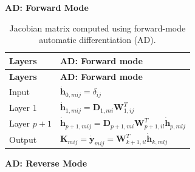 \documentclass[
  letterpaper,
  open=any]{scrbook}
\begin{document}
\textbf{AD: Forward Mode}

\begin{longtable}[]{@{}
  >{\raggedright\arraybackslash}p{}
  >{\raggedright\arraybackslash}p{}@{}}
\caption{Jacobian matrix computed using forward-mode automatic
differentiation (AD).}\label{tbl-ad-forward}\tabularnewline
\toprule\noalign{}
\begin{minipage}[b]{\linewidth}\raggedright
\textbf{Layers}
\end{minipage} & \begin{minipage}[b]{\linewidth}\raggedright
\textbf{AD: Forward mode}
\end{minipage} \\
\midrule\noalign{}
\endfirsthead
\toprule\noalign{}
\begin{minipage}[b]{\linewidth}\raggedright
\textbf{Layers}
\end{minipage} & \begin{minipage}[b]{\linewidth}\raggedright
\textbf{AD: Forward mode}
\end{minipage} \\
\midrule\noalign{}
\endhead
\bottomrule\noalign{}
\endlastfoot
Input & \(\dot{\mathbf{h}}_{0,mij}=\delta_{ij}\) \\
Layer 1 &
\(\dot{\mathbf{h}}_{1,mij}=\mathbf{D}_{1,mi}\mathbf{W}_{1,ij}^T\) \\
Layer \(p+1\) &
\(\dot{\mathbf{h}}_{p+1,mij}=\mathbf{D}_{p+1,mi}\mathbf{W}_{p+1,il}^T\dot{\mathbf{h}}_{p,mlj}\) \\
Output &
\(\mathbf{K}_{mij}=\dot{\mathbf{y}}_{mij}=\mathbf{W}_{k+1,il}^T\dot{\mathbf{h}}_{k,mlj}\) \\
\end{longtable}

\textbf{AD: Reverse Mode}
\end{document}

